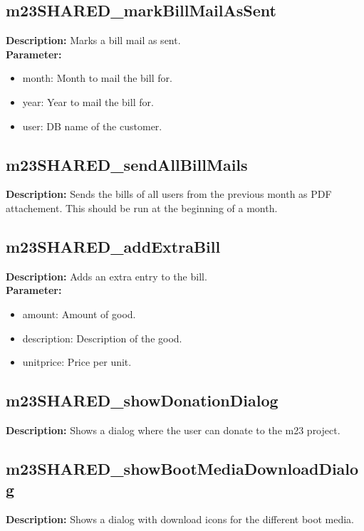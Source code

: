 \subsection{m23SHARED\_markBillMailAsSent}
\textbf{Description:} Marks a bill mail as sent.\\
\textbf{Parameter:}
\begin{itemize}
\item month: Month to mail the bill for.
\item year: Year to mail the bill for.
\item user: DB name of the customer.
\end{itemize}

\subsection{m23SHARED\_sendAllBillMails}
\textbf{Description:} Sends the bills of all users from the previous month as PDF attachement. This should be run at the beginning of a month.\\

\subsection{m23SHARED\_addExtraBill}
\textbf{Description:} Adds an extra entry to the bill.\\
\textbf{Parameter:}
\begin{itemize}
\item amount: Amount of good.
\item description: Description of the good.
\item unitprice: Price per unit.
\end{itemize}

\subsection{m23SHARED\_showDonationDialog}
\textbf{Description:} Shows a dialog where the user can donate to the m23 project.\\

\subsection{m23SHARED\_showBootMediaDownloadDialog}
\textbf{Description:} Shows a dialog with download icons for the different boot media.\\

